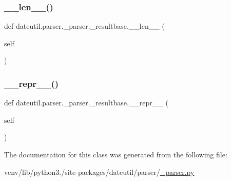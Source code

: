 \subsubsection{\texorpdfstring{\+\_\+\+\_\+len\+\_\+\+\_\+()}{\_\_len\_\_()}}
{\footnotesize\ttfamily def dateutil.\+parser.\+\_\+parser.\+\_\+resultbase.\+\_\+\+\_\+len\+\_\+\+\_\+ (\begin{DoxyParamCaption}\item[{}]{self }\end{DoxyParamCaption})}

\mbox{\label{classdateutil_1_1parser_1_1__parser_1_1__resultbase_a95faf3e3b6dcd3439394cabd3db22d03}} 
\subsubsection{\texorpdfstring{\+\_\+\+\_\+repr\+\_\+\+\_\+()}{\_\_repr\_\_()}}
{\footnotesize\ttfamily def dateutil.\+parser.\+\_\+parser.\+\_\+resultbase.\+\_\+\+\_\+repr\+\_\+\+\_\+ (\begin{DoxyParamCaption}\item[{}]{self }\end{DoxyParamCaption})}



The documentation for this class was generated from the following file\+:\begin{DoxyCompactItemize}
\item 
venv/lib/python3./site-\/packages/dateutil/parser/\hyperlink{dateutil_2parser_2__parser_8py}{\+\_\+parser.\+py}\end{DoxyCompactItemize}

